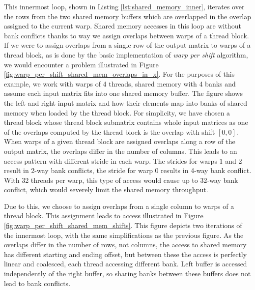 
This innermost loop, shown in Listing \ref{lst:shared_memory_inner}, iterates over the rows from the two shared memory buffers which are overlapped in the overlap assigned to the current warp. Shared memory accesses in this loop are without bank conflicts thanks to way we assign overlaps between warps of a thread block. If we were to assign overlaps from a single row of the output matrix to warps of a thread block, as is done by the basic implementation of \textit{warp per shift} algorithm, we would encounter a problem illustrated in Figure \ref{fig:warp_per_shift_shared_mem_overlaps_in_x}. For the purposes of this example, we work with warps of 4 threads, shared memory with 4 banks and assume each input matrix fits into one shared memory buffer. The figure shows the left and right input matrix and how their elements map into banks of shared memory when loaded by the thread block. For simplicity, we have chosen a thread block whose thread block submatrix contains whole input matrices as one of the overlaps computed by the thread block is the overlap with shift $[0, 0]$. When warps of a given thread block are assigned overlaps along a row of the output matrix, the overlaps differ in the number of columns. This leads to an access pattern with different stride in each warp. The strides for warps 1 and 2 result in 2-way bank conflicts, the stride for warp 0 results in 4-way bank conflict. With 32 threads per warp, this type of access would cause up to 32-way bank conflict, which would severely limit the shared memory throughput.


Due to this, we choose to assign overlaps from a single column to warps of a thread block. This assignment leads to access illustrated in Figure \ref{fig:warp_per_shift_shared_mem_shifts}. This figure depicts two iterations of the innermost loop, with the same simplifications as the previous figure.  As the overlaps differ in the number of rows, not columns, the access to shared memory has different starting and ending offset, but between these the access is perfectly linear and coalesced, each thread accessing different bank. Left buffer is accessed independently of the right buffer, so sharing banks between these buffers does not lead to bank conflicts.

